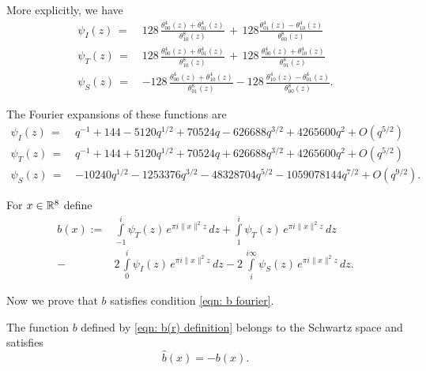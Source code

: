 \begin{lemma}\label{lemma: psi I psi T psi S explicit}
  More explicitly, we have
\begin{align}
\psi_I(z)\,=\,&128\,\frac{\theta_{00}^4(z)+\theta_{01}^4(z)}{\theta_{10}^8(z)}\,+\,128
              \frac{\theta_{01}^4(z)-\theta_{10}^4(z)}{\theta_{00}^8(z)}\label{eqn: psi I explicit}\\
\psi_T(z)\,=\,&128\,\frac{\theta_{00}^4(z)+\theta_{01}^4(z)}{\theta_{10}^8(z)}\,+
              \,128\,\frac{\theta_{00}^4(z)+\theta_{10}^4(z)}{\theta_{01}^8(z)}\label{eqn: psi T explicit}\\
\psi_S(z)\,=\,&-128\,\frac{\theta_{00}^4(z)+\theta_{10}^4(z)}{\theta_{01}^8(z)}-128\,
              \frac{\theta_{10}^4(z)-\theta_{01}^4(z)}{\theta_{00}^8(z)}.\label{eqn: psi S explicit}
\end{align}
\end{lemma}
\begin{lemma}\label{lemma: psi fourier I psi fourier T psi fourier S}
The Fourier expansions of these functions are
\begin{align}
  \psi_I(z)\,=\,&q^{-1} + 144 - 5120 q^{1/2} + 70524 q - 626688 q^{3/2} + 4265600 q^2  + O(q^{5/2}) \label{eqn: psi fourier I}\\
  \psi_T(z)\,=\,&q^{-1} + 144 + 5120 q^{1/2} + 70524 q + 626688 q^{3/2} + 4265600 q^2  + O(q^{5/2}) \label{eqn: psi fourier T}\\
  \psi_S(z)\,=\,&-10240 q^{1/2} - 1253376 q^{3/2} - 48328704 q^{5/2} - 1059078144 q^{7/2}+O(q^{9/2}).\label{eqn: psi fourier S}
\end{align}
\end{lemma}
\begin{definition}\label{def: b(r) definition}
For $x\in\mathbb{R}^8$ define
\begin{align}\label{eqn: b(r) definition}
  b(x):= & \int\limits_{-1}^{i}\psi_T(z)\,e^{\pi i \|x\|^2 z}\,dz
    + \int\limits_{1}^{i}\psi_T(z)\,e^{\pi i \|x\|^2 z}\,dz \\
  -& 2\,\int\limits_{0}^{i}\psi_I(z)\,e^{\pi i \|x\|^2 z}\,dz
  - 2\,\int\limits_{i}^{i\infty}\psi_S(z)\,e^{\pi i \|x\|^2 z}\,dz \nonumber.
\end{align}
\end{definition}
Now we prove that $b$ satisfies condition \eqref{eqn: b fourier}.
\begin{proposition}\label{prop: b(r) Fourier}
The function $b$ defined by \eqref{eqn: b(r) definition} belongs to the Schwartz space and satisfies
  $$\widehat{b}(x)=-b(x). $$
\end{proposition}
